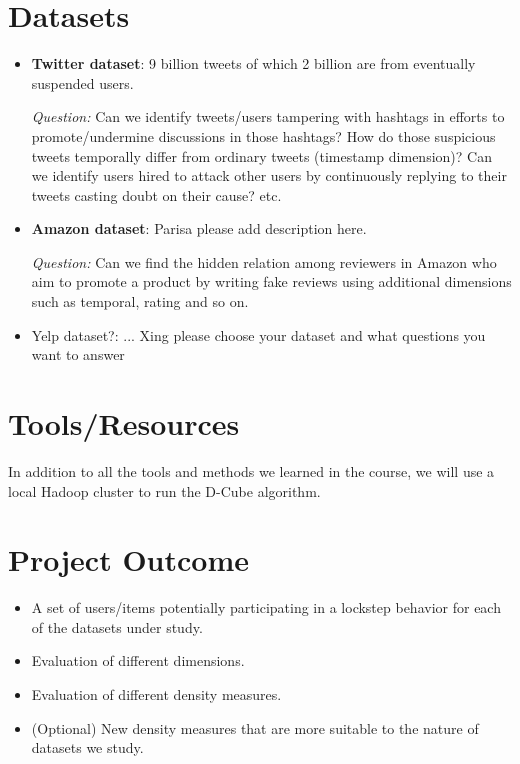 \documentclass[10pt,twocolumn]{article}
\begin{document}
\section{Datasets}
\begin{itemize}
\item \textbf{Twitter dataset}: 9 billion tweets of which 2 billion are from eventually suspended users.

\emph{Question:} Can we identify tweets/users tampering with hashtags in efforts to promote/undermine discussions in those hashtags? How do those suspicious tweets temporally differ from ordinary tweets (timestamp dimension)? Can we identify users hired to attack other users by continuously replying to their tweets casting doubt on their cause? etc. 
\item \textbf{Amazon dataset}: {\color{red} Parisa please add description here.} 

\emph{Question:} Can we find the hidden relation among reviewers in Amazon who aim to promote a product by writing fake reviews using additional dimensions such as temporal, rating and so on.  
\item Yelp dataset?: ... {\color{red}Xing please choose your dataset and what questions you want to answer} 
\end{itemize}




 
\section{Tools/Resources}
In addition to all the tools and methods we learned in the course, we will use a local Hadoop cluster to run the D-Cube algorithm.

\section{Project Outcome}

\begin{itemize}
	
	\item A set of users/items potentially participating in a lockstep behavior for each of the datasets under study.
	\item Evaluation of different dimensions. 
	\item Evaluation of different density measures.
	\item (Optional) New density measures that are more suitable to the nature of datasets we study.
\end{itemize}



\end{document}
